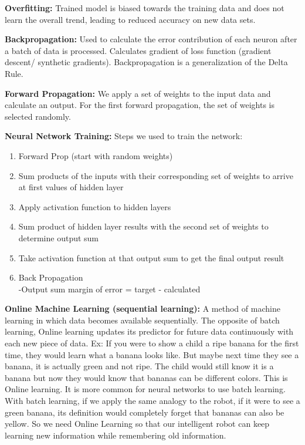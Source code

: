 \documentclass[draftclsnofoot, onecolumn, 10pt, compsoc]{IEEEtran}
\begin{document}
		\noindent\textbf{Overfitting:} Trained model is biased towards the training data and does not learn the overall trend, leading to reduced accuracy on new data sets.

		\noindent\textbf{Backpropagation:} Used to calculate the error contribution of each neuron after a batch of data is processed. Calculates gradient of loss function (gradient descent/ synthetic gradients). Backpropagation is a generalization of the Delta Rule.
		
		\noindent\textbf{Forward Propagation:} We apply a set of weights to the input data and calculate an output. For the first forward propagation, the set of weights is selected randomly.
		
		\noindent\textbf{Neural Network Training:} Steps we used to train the network:
			\begin{enumerate}
				\item Forward Prop (start with random weights)
				\item Sum products of the inputs with their corresponding set of weights to arrive at first values of hidden layer
				\item Apply activation function to hidden layers
				\item Sum product of hidden layer results with the second set of weights to determine output sum
				\item Take activation function at that output sum to get the final output result
				\item Back Propagation \cite{neuralnets} \\
				-Output sum margin of error = target - calculated
			\end{enumerate}
	
		\noindent\textbf{Online Machine Learning (sequential learning):} A method of machine learning in which data becomes available sequentially. The opposite of batch learning, Online learning updates its predictor for future data continuously with each new piece of data. Ex: If you were to show a child a ripe banana for the first time, they would learn what a banana looks like. But maybe next time they see a banana, it is actually green and not ripe. The child would still know it is a banana but now they would know that bananas can be different colors. This is Online learning. It is more common for neural networks to use batch learning. With batch learning, if we apply the same analogy to the robot, if it were to see a green banana, its definition would completely forget that bananas can also be yellow. So we need Online Learning so that our intelligent robot can keep learning new information while remembering old information.
		
\end{document}
